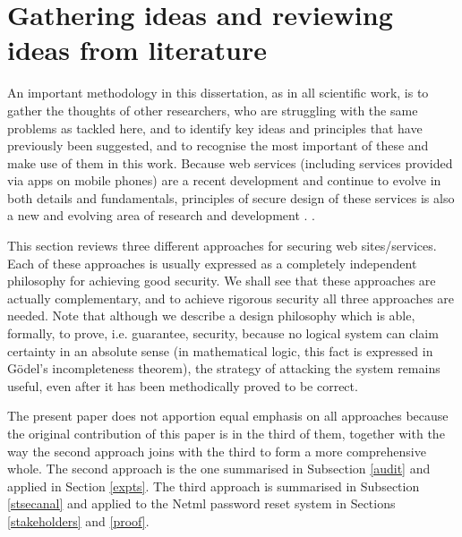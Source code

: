 \section{Gathering ideas and reviewing ideas from literature}


An important methodology in this dissertation, as in all scientific work, is to gather the thoughts of other researchers, who are struggling with the same problems as tackled here, and to identify key ideas and principles that have previously been suggested, and to recognise the most important of these and make use of them in this work.
\if
Because web services (including services provided via apps on mobile phones)
are a recent development and continue to evolve in both details and fundamentals,
principles of secure design of these services is also a new and evolving area of
research and development \cite{AddieColman2010,Addie_Moffatt_Dekeyser_Colman2011}.
\else\cite{Addie_Moffatt_Dekeyser_Colman2011}.
\fi

This section reviews three different approaches for securing web sites/services.
Each of these approaches is usually expressed as a completely independent
philosophy for achieving good security. We shall see that these approaches 
are actually complementary, and to achieve rigorous security all three approaches
are needed. Note that although we describe a design philosophy which is able, formally, to prove,
i.e.  guarantee, security, because no logical system can claim certainty in an absolute
sense (in mathematical logic, this fact is expressed in G\"odel's incompleteness theorem), the strategy 
of attacking the system remains useful, even after it has been
methodically proved to be correct.

The present paper does not apportion equal emphasis on all approaches
because the original contribution of this paper is 
in the third of them, together with the way the second approach joins
with the third to form a more comprehensive whole. The second approach
is the one summarised in Subsection \ref{audit} and applied
in Section \ref{expts}.
The third approach is summarised in Subsection \ref{stsecanal} and applied
to the Netml password reset system in Sections \ref{stakeholders} and \ref{proof}.








